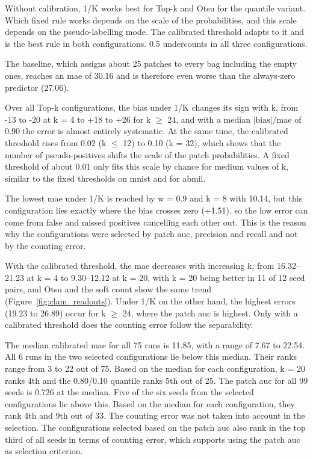 \documentclass[12pt,parskip = half, DIV=classic,listof=totoc]{scrartcl}
\begin{document}
			Without calibration, 1/K works best for Top-k and Otsu for the quantile variant. Which fixed 
			rule works depends on the scale of the probabilities, and this scale depends on the pseudo-labelling mode. The calibrated
			threshold adapts to it and is the best rule in both configurations. 0.5 undercounts in all three configurations.

			The baseline, which assigns about 25 patches to every bag including the empty ones, 
			reaches an \ac{mae} of 30.16 and is therefore even worse than the always-zero predictor (27.06).

			Over all Top-k configurations, the bias under 1/K changes its sign with k, from -13 to -20 at k = 4 to +18 to 
			+26 for k $\geq$ 24, and with a median $|\text{bias}|/$\ac{mae} of 0.90 the error is almost entirely systematic. 
			At the same time, the calibrated threshold rises from 0.02 (k $\leq$ 12) to 0.10 (k = 32), which 
			shows that the number of pseudo-positives shifts the scale of the patch probabilities. A 
			fixed threshold of about 0.01 only fits this scale by chance for medium values of k, 
			similar to the fixed thresholds on \ac{mnist} and for \ac{abmil}.

			The lowest \ac{mae} under 1/K is reached by w = 0.9 and k = 8 with 10.14, but this configuration lies 
			exactly where the bias crosses zero (+1.51), so the low error can come from false and missed 
			positives cancelling each other out. This is the reason why the configurations were selected by 
			patch \ac{auc}, precision and recall and not by the counting error.

			With the calibrated threshold, the \ac{mae} decreases with increasing k, from 16.32–21.23 at k = 4 
			to 9.30–12.12 at k = 20, with k = 20 being better in 11 of 12 seed pairs, and Otsu and 
			the soft count show the same trend (Figure~\ref{fig:clam_readouts}). Under 1/K on the other hand, the highest 
			errors (19.23 to 26.89) occur for k $\geq$ 24, where the patch \ac{auc} is highest. Only with a 
			calibrated threshold does the counting error follow the separability.

			The median calibrated \ac{mae} for all 75 runs is 11.85, with a range of 7.67
			to 22.54. All 6 runs in the two selected configurations lie below this median.
			Their ranks range from 3 to 22 out of 75. Based on the median for each configuration,
			k = 20 ranks 4th and the 0.80/0.10 quantile ranks 5th out of 25. The patch \ac{auc} for all 99
			seeds is 0.726 at the median. Five of the six seeds from the selected
			configurations lie above this. Based on the median for each configuration, they rank 4th and 9th out of
			33. The counting error was not taken into account in the selection. The configurations selected based on the patch \ac{auc}
			also rank in the top third of all seeds in terms of counting error, which supports using the patch \ac{auc} as selection criterion.
\end{document}
